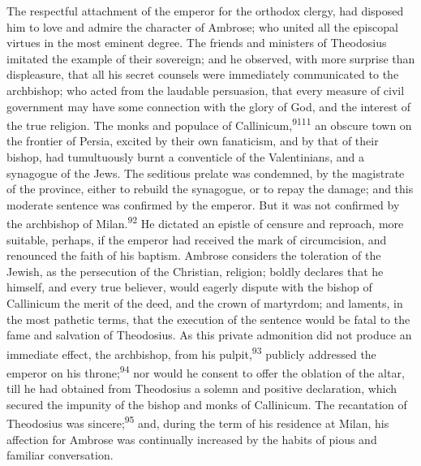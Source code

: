 
The respectful attachment of the emperor for the orthodox clergy,
had disposed him to love and admire the character of Ambrose; who
united all the episcopal virtues in the most eminent degree. The
friends and ministers of Theodosius imitated the example of their
sovereign; and he observed, with more surprise than displeasure,
that all his secret counsels were immediately communicated to the
archbishop; who acted from the laudable persuasion, that every
measure of civil government may have some connection with the
glory of God, and the interest of the true religion. The monks
and populace of Callinicum,\textsuperscript{9111} an obscure town on the frontier
of Persia, excited by their own fanaticism, and by that of their
bishop, had tumultuously burnt a conventicle of the Valentinians,
and a synagogue of the Jews. The seditious prelate was condemned,
by the magistrate of the province, either to rebuild the
synagogue, or to repay the damage; and this moderate sentence was
confirmed by the emperor. But it was not confirmed by the
archbishop of Milan.\textsuperscript{92} He dictated an epistle of censure and
reproach, more suitable, perhaps, if the emperor had received the
mark of circumcision, and renounced the faith of his baptism.
Ambrose considers the toleration of the Jewish, as the
persecution of the Christian, religion; boldly declares that he
himself, and every true believer, would eagerly dispute with the
bishop of Callinicum the merit of the deed, and the crown of
martyrdom; and laments, in the most pathetic terms, that the
execution of the sentence would be fatal to the fame and
salvation of Theodosius. As this private admonition did not
produce an immediate effect, the archbishop, from his pulpit,\textsuperscript{93}
publicly addressed the emperor on his throne;\textsuperscript{94} nor would he
consent to offer the oblation of the altar, till he had obtained
from Theodosius a solemn and positive declaration, which secured
the impunity of the bishop and monks of Callinicum. The
recantation of Theodosius was sincere;\textsuperscript{95} and, during the term of
his residence at Milan, his affection for Ambrose was continually
increased by the habits of pious and familiar conversation.

